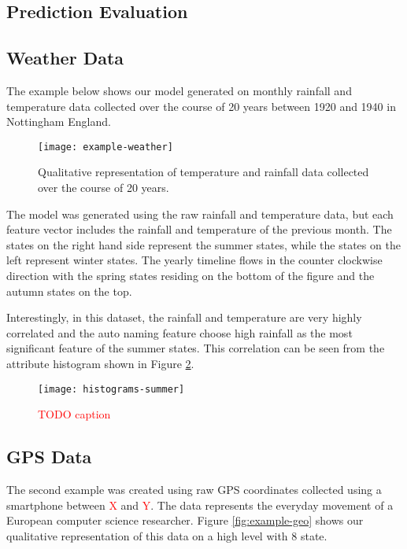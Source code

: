 \subsection{Prediction Evaluation}

\subsection{Weather Data}
\label{sec:experiments-weather}

The example below shows our model generated on monthly rainfall and temperature data
collected over the course of 20 years between 1920 and 1940 in Nottingham England.

\begin{figure}[h!]
	\centering
	\texttt{[image: example-weather]}
	\caption{Qualitative representation of temperature and rainfall data collected over the course of 20 years.}
	\label{fig:example-weather}
\end{figure}

The model was generated using the raw rainfall and temperature data, but each feature vector includes
the rainfall and temperature of the previous month. The states on the right hand side represent the 
summer states, while the states on the left represent winter states. The yearly timeline flows in the
counter clockwise direction with the spring states residing on the bottom of the figure and the autumn
states on the top.

Interestingly, in this dataset, the rainfall and temperature are very highly correlated and the auto naming feature
choose high rainfall as the most significant feature of the summer states. This correlation can be seen
from the attribute histogram shown in Figure \ref{fig:histograms-summer}.

\begin{figure}[h!]
	\centering
	\texttt{[image: histograms-summer]}
	\caption{\textcolor{red}{TODO caption}}
	\label{fig:histograms-summer}
\end{figure}

\subsection{GPS Data}

The second example was created using raw GPS coordinates collected using a smartphone between \textcolor{red}{X} and \textcolor{red}{Y}.
The data represents the everyday movement of a European computer science researcher. Figure \ref{fig:example-geo}
shows our qualitative representation of this data on a high level with 8 state.


